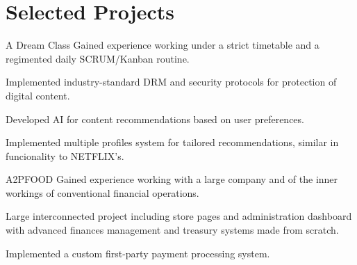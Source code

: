 \section{Selected Projects}

\begin{experience}{A Dream Class}{
}
Gained experience working under a strict timetable and a regimented daily SCRUM/Kanban routine.

\begin{contribs}
	\item{Implemented industry-standard DRM and security protocols for protection of digital content.}
	\item{Developed AI for content recommendations based on user preferences.}
	\item{Implemented multiple profiles system for tailored recommendations, similar in funcionality to NETFLIX's.}
\end{contribs}
\end{experience}

\begin{experience}{A2PFOOD}{
}
Gained experience working with a large company and of the inner workings of conventional financial operations.

\begin{contribs}
	\item{Large interconnected project including store pages and administration dashboard with advanced finances management and treasury systems made from scratch.}
	\item{Implemented a custom first-party payment processing system.}
\end{contribs}
\end{experience}
